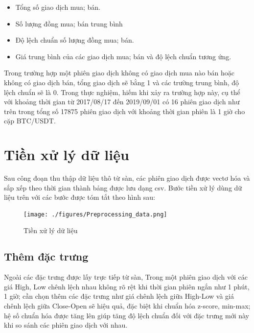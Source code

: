 \begin{itemize}
    \item Tổng số giao dịch mua; bán.
    \item Số lượng đồng mua; bán trung bình
    \item Độ lệch chuẩn số lượng đồng mua; bán.
    \item Giá trung bình của các  giao dịch mua; bán và độ lệch chuẩn tương ứng.
\end{itemize}
Trong trường hợp một phiên giao dịch không có giao dịch mua nào bán hoặc không có giao dịch bán, tổng giao dịch sẽ bằng 1 và các trường trung bình, độ lệch chuẩn sẽ là 0. Trong thực nghiệm, hiếm khi xảy ra trường hợp này, cụ thể với khoảng thời gian từ 2017/08/17 đến 2019/09/01 có 16 phiên giao dịch như trên trong tổng số  17875 phiên giao dịch với khoảng thời gian phiên là 1 giờ cho cặp BTC/USDT.

\section{Tiền xử lý dữ liệu}
Sau công đoạn thu thập dữ liệu thô từ sàn, các phiên giao dịch được vectơ hóa và sắp xếp theo thời gian thành bảng được lưu dạng csv. Bước tiền xử lý dùng dữ liệu trên với các bước được tóm tắt theo hình sau:
\begin{figure}[H]
	\center	\texttt{[image: ./figures/Preprocessing\_data.png]}
	\caption{Tiền xử lý dữ liệu}
	\label{fig:Preprocessing_data}

\end{figure}


\subsection{Thêm đặc trưng}
Ngoài các đặc trưng được lấy trực tiếp từ sàn, Trong một phiên giao dịch với các giá High, Low chênh lệch nhau không rõ rệt khi thời gian phiên ngắn như 1 phút, 1 giờ; cần chọn thêm các đặc trưng như giá chênh lệch giữa High-Low và giá chênh lệch giữa Close-Open sẽ hiệu quả, đặc biệt khi chuẩn hóa z-score, min-max; hệ số chuẩn hóa được tăng lên giúp tăng độ lệch chuẩn đối với đặc trưng mới này khi so sánh các phiên giao dịch với nhau.
